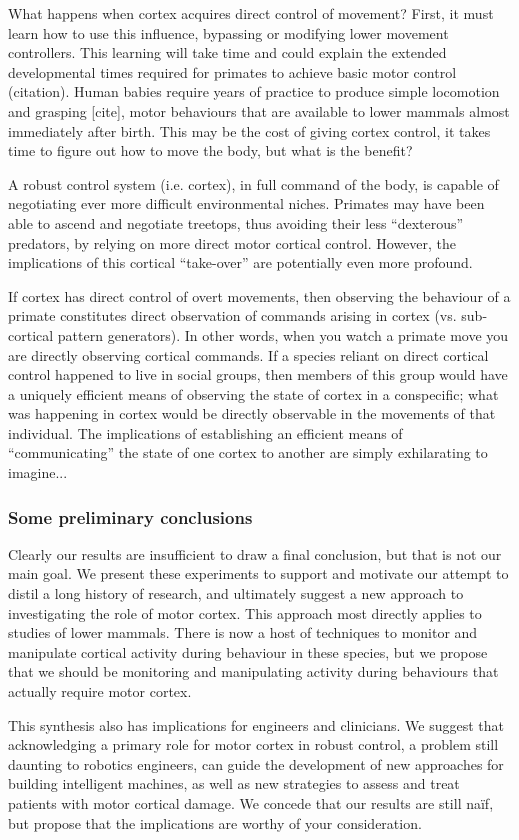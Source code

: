 What happens when cortex acquires direct control of movement? First, it must learn how to use this influence, bypassing or modifying lower movement controllers. This learning will take time and could explain the extended developmental times required for primates to achieve basic motor control (citation). Human babies require years of practice to produce simple locomotion and grasping [cite], motor behaviours that are available to lower mammals almost immediately after birth. This may be the cost of giving cortex control, it takes time to figure out how to move the body, but what is the benefit? 

A robust control system (i.e. cortex), in full command of the body, is capable of negotiating ever more difficult environmental niches. Primates may have been able to ascend and negotiate treetops, thus avoiding their less ``dexterous'' predators, by relying on more direct motor cortical control. However, the implications of this cortical ``take-over'' are potentially even more profound. 

If cortex has direct control of overt movements, then observing the behaviour of a primate constitutes direct observation of commands arising in cortex (vs. sub-cortical pattern generators). In other words, when you watch a primate move you are directly observing cortical commands. If a species reliant on direct cortical control happened to live in social groups, then members of this group would have a uniquely efficient means of observing the state of cortex in a conspecific; what was happening in cortex would be directly observable in the movements of that individual. The implications of establishing an efficient means of ``communicating'' the state of one cortex to another are simply exhilarating to imagine...

\subsubsection*{Some preliminary conclusions}

Clearly our results are insufficient to draw a final conclusion, but that is not our main goal. We present these experiments to support and motivate our attempt to distil a long history of research, and ultimately suggest a new approach to investigating the role of motor cortex. This approach most directly applies to studies of lower mammals. There is now a host of techniques to monitor and manipulate cortical activity during behaviour in these species, but we propose that we should be monitoring and manipulating activity during behaviours that actually require motor cortex.

This synthesis also has implications for engineers and clinicians. We suggest that acknowledging a primary role for motor cortex in robust control, a problem still daunting to robotics engineers, can guide the development of new approaches for building intelligent machines, as well as new strategies to assess and treat patients with motor cortical damage. We concede that our results are still naïf, but propose that the implications are worthy of your consideration.

